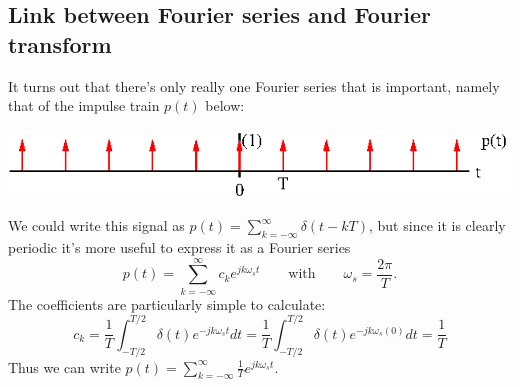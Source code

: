 \documentclass[10pt]{beamer}
\begin{document}
\subsection{Link between Fourier series and Fourier transform}

It turns out that there's only really one Fourier series that is important, namely that of the impulse train $p(t)$ below:
\begin{center}
  \includegraphics{imptraintfp}
\end{center}
We could write this signal as $p(t) = \sum_{k=-\infty}^{\infty} \delta(t - kT)$, but since it is clearly periodic it's more useful to express it as a Fourier series
\begin{equation*}
  p(t) = \sum_{k=-\infty}^{\infty} c_k e^{j k \omega_s t} \qquad \text{with} \qquad \omega_s = \frac{2 \pi}{T}.
\end{equation*}
The coefficients are particularly simple to calculate:
\begin{equation*}
  c_k = \frac{1}{T} \int_{-T/2}^{T/2} \delta(t) e^{-j k \omega_s t} dt = 
  \frac{1}{T} \int_{-T/2}^{T/2} \delta(t) e^{-j k \omega_s (0)} dt = \frac{1}{T}
\end{equation*}
Thus we can write $p(t) = \sum_{k=-\infty}^{\infty} \frac{1}{T} e^{j k \omega_s t}$.
\end{document}
